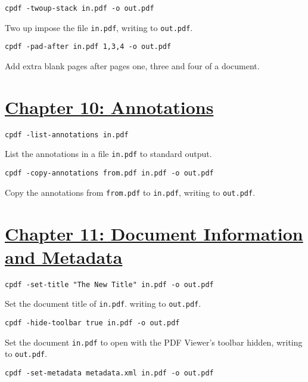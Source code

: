 \documentclass{book}
\begin{document}
\begin{framed}\noindent\texttt{cpdf -twoup-stack in.pdf -o out.pdf}\end{framed}

\noindent Two up impose the file \texttt{in.pdf}, writing to \texttt{out.pdf}.

\begin{framed}\noindent\texttt{cpdf -pad-after in.pdf 1,3,4 -o out.pdf}\end{framed}

\noindent Add extra blank pages after pages one, three and four of a document.

\section*{\hyperref[chap:10]{Chapter 10: Annotations}}

\begin{framed}\noindent\texttt{cpdf -list-annotations in.pdf}\end{framed}

\noindent List the annotations in a file \texttt{in.pdf} to standard output.

\begin{framed}\noindent\texttt{cpdf -copy-annotations from.pdf in.pdf -o out.pdf}\end{framed}

\noindent Copy the annotations from \texttt{from.pdf} to \texttt{in.pdf}, writing to \texttt{out.pdf}.

\section*{\hyperref[chap:11]{Chapter 11: Document Information and Metadata}}

\begin{framed}\noindent\texttt{cpdf -set-title "The New Title" in.pdf -o out.pdf}\end{framed}

\noindent Set the document title of \texttt{in.pdf}. writing to \texttt{out.pdf}.

\begin{framed}\noindent\texttt{cpdf -hide-toolbar true in.pdf -o out.pdf}\end{framed}

\noindent Set the document \texttt{in.pdf} to open with the PDF Viewer's toolbar hidden, writing to \texttt{out.pdf}.

\begin{framed}\noindent\texttt{cpdf -set-metadata metadata.xml in.pdf -o out.pdf}\end{framed}
\end{document}

